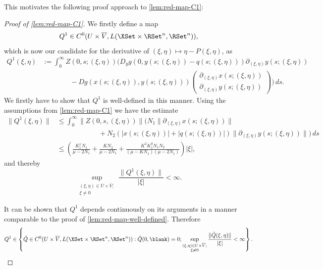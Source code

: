 \documentclass[a4paper]{siamart190516}
\begin{document}
This motivates the following proof approach to \cref{lem:red-map-C1}:
\begin{proof}[Proof of \cref{lem:red-map-C1}]
We firstly define a map
\[
Q^1 \in C^0(U \times \overline{V}, L(\XSet \times \RSet^n, \RSet^n)),
\]
which is now our candidate for the derivative of $(\xi,\eta) \mapsto \eta - P(\xi,\eta)$, as
\begin{align*}
Q^1(\xi,\eta) &:=  \int_0^{\infty} Z(0,s; (\xi,\eta)) \Bigg( D_y g(0,y(s;(\xi,\eta)) - q(s;(\xi,\eta))) \partial_{(\xi,\eta)}y(s; (\xi,\eta))  \\
&\qquad \qquad - D g(x(s;(\xi,\eta)),y(s;(\xi,\eta))) \begin{pmatrix} \partial_{(\xi,\eta)}x(s; (\xi,\eta)) \\ \partial_{(\xi,\eta)}y(s; (\xi,\eta)) \end{pmatrix} \Bigg) \, ds.
\end{align*}
We firstly have to show that $Q^1$ is well-defined in this manner. Using the
assumptions from \cref{lem:red-map-C1} we have the estimate
\begin{align*}
\| Q^1(\xi,\eta) \| &\leq  \int_0^{\infty} \| Z(0,s, (\xi,\eta)) \| \bigg( N_1 \| \partial_{(\xi,\eta)}x(s; (\xi,\eta)) \| \\
&\qquad \qquad \qquad + N_2 \left( |x(s; (\xi,\eta))| + |q(s; (\xi,\eta))| \right) \| \partial_{(\xi,\eta)}y(s; (\xi,\eta)) \| \bigg)  \, ds \\
&\leq \left( \frac{K^x_1 N_1}{\mu -  2 N_1} + \frac{K N_2 }{\mu - 2N_1} + \frac{K^2 K^y_1 N_1 N_2}{(\mu - K N_1)(\mu - 2 N_1)} \right) |\xi|,
\end{align*}
and thereby
\[
\sup_{\substack{(\xi,\eta) \in U \times \overline{V}; \\ \xi \neq 0}} \frac{\|Q^1(\xi,\eta)\|}{|\xi|} < \infty.
\]

It can be shown that $Q^1$ depends continuously on its arguments in a manner
comparable to the proof of \cref{lem:red-map-well-defined}. Therefore
\[
Q^1 \in \left\{ \tilde{Q} \in C^{0}(U \times \overline{V}, L(\XSet \times \RSet^n, \RSet^n)): \tilde{Q}(0, \blank) = 0 ;  \sup_{\substack{(\xi,\eta) \in U \times \overline{V}; \\ \xi \neq 0}} \frac{\|\tilde{Q}(\xi,\eta)\|}{|\xi|} < \infty  \right\}.
\]


\end{proof}
\end{document}
